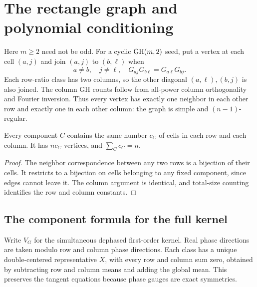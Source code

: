 \section{The rectangle graph and polynomial conditioning}\label{sec:graph}
Here $m\ge2$ need not be odd. For a cyclic $\operatorname{GH}(m,2)$ seed, put a vertex at each cell $(a,j)$ and join $(a,j)$ to $(b,\ell)$ when
\begin{equation}\label{eq:edge}
 a\ne b,\quad j\ne\ell,\quad G_{aj}G_{b\ell}=G_{a\ell}G_{bj}.
\end{equation}
Each row-ratio class has two columns, so the other diagonal $(a,\ell),(b,j)$ is also joined. The column GH counts follow from all-power column orthogonality and Fourier inversion. Thus every vertex has exactly one neighbor in each other row and exactly one in each other column: the graph is simple and $(n-1)$-regular.

\begin{lemma}\label{lem:componentweight}
Every component $C$ contains the same number $c_C$ of cells in each row and each column. It has $nc_C$ vertices, and $\sum_Cc_C=n$.
\end{lemma}
\begin{proof}
The neighbor correspondence between any two rows is a bijection of their cells. It restricts to a bijection on cells belonging to any fixed component, since edges cannot leave it. The column argument is identical, and total-size counting identifies the row and column constants.
\end{proof}

\subsection{The component formula for the full kernel}
Write $V_G$ for the simultaneous dephased first-order kernel. Real phase directions are taken modulo row and column phase directions. Each class has a unique double-centered representative $X$, with every row and column sum zero, obtained by subtracting row and column means and adding the global mean. This preserves the tangent equations because phase gauges are exact symmetries.

